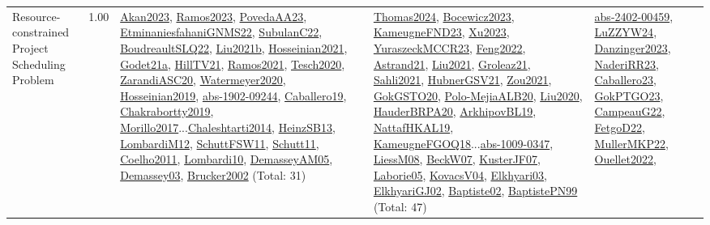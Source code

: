 {\begin{longtable}{p{3cm}r>{\raggedright\arraybackslash}p{6cm}>{\raggedright\arraybackslash}p{6cm}>{\raggedright\arraybackslash}p{8cm}}
\index{Resource-constrained Project Scheduling Problem}\index{Classification!Resource-constrained Project Scheduling Problem}Resource-constrained Project Scheduling Problem &  1.00 & \hyperref[detail:Akan2023]{Akan2023}, \hyperref[detail:Ramos2023]{Ramos2023}, \hyperref[detail:PovedaAA23]{PovedaAA23}, \hyperref[detail:EtminaniesfahaniGNMS22]{EtminaniesfahaniGNMS22}, \hyperref[detail:SubulanC22]{SubulanC22}, \hyperref[detail:BoudreaultSLQ22]{BoudreaultSLQ22}, \hyperref[detail:Liu2021b]{Liu2021b}, \hyperref[detail:Hosseinian2021]{Hosseinian2021}, \hyperref[detail:Godet21a]{Godet21a}, \hyperref[detail:HillTV21]{HillTV21}, \hyperref[detail:Ramos2021]{Ramos2021}, \hyperref[detail:Tesch2020]{Tesch2020}, \hyperref[detail:ZarandiASC20]{ZarandiASC20}, \hyperref[detail:Watermeyer2020]{Watermeyer2020}, \hyperref[detail:Hosseinian2019]{Hosseinian2019}, \hyperref[detail:abs-1902-09244]{abs-1902-09244}, \hyperref[detail:Caballero19]{Caballero19}, \hyperref[detail:Chakrabortty2019]{Chakrabortty2019}, \hyperref[detail:Morillo2017]{Morillo2017}...\hyperref[detail:Chaleshtarti2014]{Chaleshtarti2014}, \hyperref[detail:HeinzSB13]{HeinzSB13}, \hyperref[detail:LombardiM12]{LombardiM12}, \hyperref[detail:SchuttFSW11]{SchuttFSW11}, \hyperref[detail:Schutt11]{Schutt11}, \hyperref[detail:Coelho2011]{Coelho2011}, \hyperref[detail:Lombardi10]{Lombardi10}, \hyperref[detail:DemasseyAM05]{DemasseyAM05}, \hyperref[detail:Demassey03]{Demassey03}, \hyperref[detail:Brucker2002]{Brucker2002} (Total: 31) & \hyperref[detail:Thomas2024]{Thomas2024}, \hyperref[detail:Bocewicz2023]{Bocewicz2023}, \hyperref[detail:KameugneFND23]{KameugneFND23}, \hyperref[detail:Xu2023]{Xu2023}, \hyperref[detail:YuraszeckMCCR23]{YuraszeckMCCR23}, \hyperref[detail:Feng2022]{Feng2022}, \hyperref[detail:Astrand21]{Astrand21}, \hyperref[detail:Liu2021]{Liu2021}, \hyperref[detail:Groleaz21]{Groleaz21}, \hyperref[detail:Sahli2021]{Sahli2021}, \hyperref[detail:HubnerGSV21]{HubnerGSV21}, \hyperref[detail:Zou2021]{Zou2021}, \hyperref[detail:GokGSTO20]{GokGSTO20}, \hyperref[detail:Polo-MejiaALB20]{Polo-MejiaALB20}, \hyperref[detail:Liu2020]{Liu2020}, \hyperref[detail:HauderBRPA20]{HauderBRPA20}, \hyperref[detail:ArkhipovBL19]{ArkhipovBL19}, \hyperref[detail:NattafHKAL19]{NattafHKAL19}, \hyperref[detail:KameugneFGOQ18]{KameugneFGOQ18}...\hyperref[detail:abs-1009-0347]{abs-1009-0347}, \hyperref[detail:LiessM08]{LiessM08}, \hyperref[detail:BeckW07]{BeckW07}, \hyperref[detail:KusterJF07]{KusterJF07}, \hyperref[detail:Laborie05]{Laborie05}, \hyperref[detail:KovacsV04]{KovacsV04}, \hyperref[detail:Elkhyari03]{Elkhyari03}, \hyperref[detail:ElkhyariGJ02]{ElkhyariGJ02}, \hyperref[detail:Baptiste02]{Baptiste02}, \hyperref[detail:BaptistePN99]{BaptistePN99} (Total: 47) & \hyperref[detail:abs-2402-00459]{abs-2402-00459}, \hyperref[detail:LuZZYW24]{LuZZYW24}, \hyperref[detail:Danzinger2023]{Danzinger2023}, \hyperref[detail:NaderiRR23]{NaderiRR23}, \hyperref[detail:Caballero23]{Caballero23}, \hyperref[detail:GokPTGO23]{GokPTGO23}, \hyperref[detail:CampeauG22]{CampeauG22}, \hyperref[detail:FetgoD22]{FetgoD22}, \hyperref[detail:MullerMKP22]{MullerMKP22}, \hyperref[detail:Ouellet2022]{Ouellet2022}, 
\end{longtable}}
